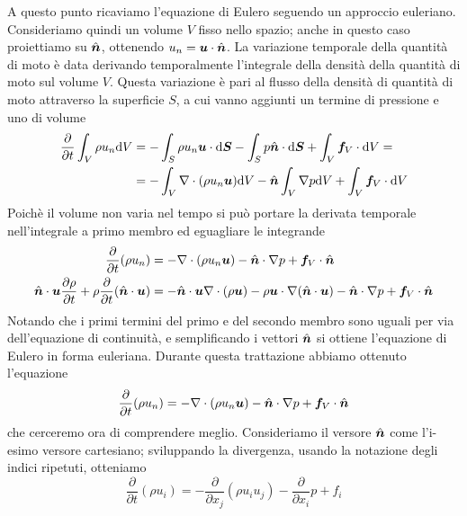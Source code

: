 A questo punto ricaviamo l'equazione di Eulero seguendo un approccio euleriano. Consideriamo quindi un volume $V$ fisso nello spazio; anche in questo caso proiettiamo su $\V{\hat{n}}$, ottenendo $u_n = \V{u}\cdot\V{\hat{n}}$. La variazione temporale della quantità di moto è data derivando temporalmente l'integrale della densità della quantità di moto sul volume $V$. Questa variazione è pari al flusso della densità di quantità di moto attraverso la superficie $S$, a cui vanno aggiunti un termine di pressione e uno di volume
\begin{align*}
\frac{\partial}{\partial t}\int_V \rho u_n \dd V  & = -\int_S \rho u_n \V{u} \cdot \dd \V{S} - \int_S p \V{\hat{n}} \cdot \dd \V{S} + \int_V \V{f}_V \cdot \dd V =  \\
& = -\int_V \V{\nabla} \cdot (\rho u_n \V{u}) \dd V - \V{\hat{n}} \int_V \V{\nabla}p \dd V + \int_V \V{f}_V \cdot \dd V
\end{align*}
Poichè il volume non varia nel tempo si può portare la derivata temporale nell'integrale a primo membro ed eguagliare le integrande
\begin{align*}
\frac{\partial}{\partial t} (\rho u_n )& =  - \V{\nabla} \cdot (\rho u_n \V{u}) - \V{\hat{n}} \cdot \V{\nabla}p + \V{f}_V \cdot
\V{\hat{n}} \\
\V{\hat{n}} \cdot \V{u} \frac{\partial \rho}{\partial t} + \rho \frac{\partial}{\partial t}(\V{\hat{n}} \cdot \V{u}) & = - \V{\hat{n}} \cdot \V{u} \V{\nabla} \cdot (\rho \V{u}) - \rho \V{u} \cdot \V{\nabla}(\V{\hat{n}} \cdot \V{u}) - \V{\hat{n}} \cdot \V{\nabla} p + \V{f}_V \cdot \V{\hat{n}}
\end{align*}
Notando che i primi termini del primo e del secondo membro sono uguali per via dell'equazione di continuità, e semplificando i vettori $\V{\hat{n}}$ si ottiene l'equazione di Eulero in forma euleriana. Durante questa trattazione abbiamo ottenuto l'equazione
\begin{equation}
\frac{\partial}{\partial t} (\rho u_n)  =  - \V{\nabla} \cdot (\rho u_n \V{u}) - \V{\hat{n}} \cdot \V{\nabla}p + \V{f}_V \cdot \V{\hat{n}}
\end{equation}
che cerceremo ora di comprendere meglio. Consideriamo il versore $\V{\hat{n}}$ come l'i-esimo versore cartesiano; sviluppando la divergenza, usando la notazione degli indici ripetuti, otteniamo
\begin{equation}
\frac{\partial}{\partial t} (\rho u_i) =  - \frac{\partial}{\partial x_j} (\rho u_i u_j) - \frac{\partial}{\partial x_i} p + f_i
\end{equation}
